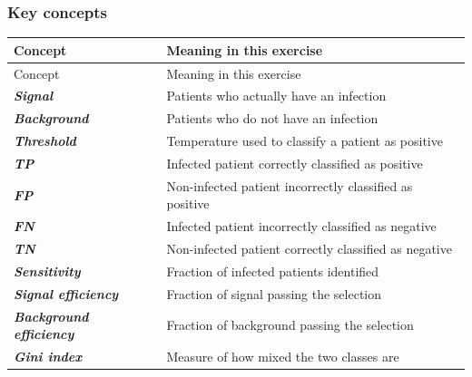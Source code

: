 \documentclass{course_sheet}
\begin{document}
\subsubsection*{Key concepts}
\begingroup
\small
\setlength{\tabcolsep}{4pt}
\begin{longtable}{l|l}
Concept & Meaning in this exercise \\[1.5pt]
\hline
\endfirsthead
Concept & Meaning in this exercise \\[1.5pt]
\hline
\endhead
\textbf{\textit{Signal}} & Patients who actually have an infection \\[1.5pt]
\textbf{\textit{Background}} & Patients who do not have an infection \\[1.5pt]
\textbf{\textit{Threshold}} & Temperature used to classify a patient as positive \\[1.5pt]
\textbf{\textit{TP}} & Infected patient correctly classified as positive \\[1.5pt]
\textbf{\textit{FP}} & Non-infected patient incorrectly classified as positive \\[1.5pt]
\textbf{\textit{FN}} & Infected patient incorrectly classified as negative \\[1.5pt]
\textbf{\textit{TN}} & Non-infected patient correctly classified as negative \\[1.5pt]
\textbf{\textit{Sensitivity}} & Fraction of infected patients identified \\[1.5pt]
\textbf{\textit{Signal efficiency}} & Fraction of signal passing the selection \\[1.5pt]
\textbf{\textit{Background efficiency}} & Fraction of background passing the selection \\[1.5pt]
\textbf{\textit{Gini index}} & Measure of how mixed the two classes are \\[1.5pt]
\end{longtable}
\endgroup
\end{document}
